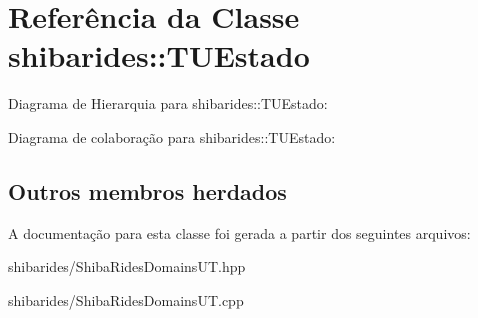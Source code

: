\hypertarget{classshibarides_1_1TUEstado}{}\section{Referência da Classe shibarides\+:\+:T\+U\+Estado}
\label{classshibarides_1_1TUEstado}


Diagrama de Hierarquia para shibarides\+:\+:T\+U\+Estado\+:


Diagrama de colaboração para shibarides\+:\+:T\+U\+Estado\+:
\subsection*{Outros membros herdados}


A documentação para esta classe foi gerada a partir dos seguintes arquivos\+:\begin{DoxyCompactItemize}
\item 
shibarides/Shiba\+Rides\+Domains\+U\+T.\+hpp\item 
shibarides/Shiba\+Rides\+Domains\+U\+T.\+cpp\end{DoxyCompactItemize}
